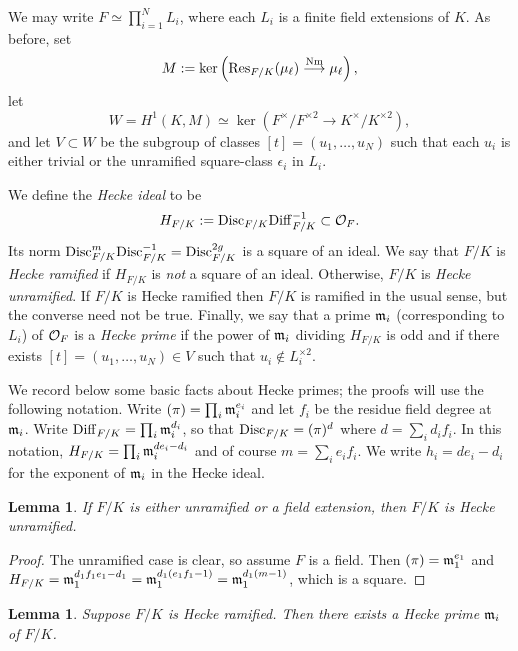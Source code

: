 \documentclass[11pt,a4paper]{amsart}
\def\m{{\rm \mathfrak{m}}}
\def\O{{\rm \mathcal{O}}}
\def\Nm{{\rm Nm}}
\def\Diff{{\rm Diff}}
\def\Disc{{\rm Disc}}
\def\Res{{\rm Res}}
\numberwithin{equation}{section}
\newtheorem{lemma}[theorem]{Lemma}
\begin{document}
We may write $F \simeq \prod_{i = 1}^N L_i$, where each $L_i$ is a finite field extensions of $K$. As before, set
\[M := \ker\left(\Res_{F/K}(\mu_\ell) \stackrel{\Nm}{\longrightarrow} \mu_\ell\right),\]
let 
\[W = H^1(K, M) \simeq \ker(F^\times/F^{\times 2} \to K^\times/K^{\times 2}),\] 
and let $V \subset W$ be the subgroup of classes $[t] = (u_1,\ldots, u_N)$ such that each $u_i$ is either trivial or the unramified square-class $\epsilon_i$ in $L_i$. 


We define the {\it Hecke ideal} to be
\[H_{F/K} := \Disc_{F/K}\mathrm{Diff}_{F/K}^{-1} \subset \O_F.\]
Its norm $\Disc_{F/K}^m\Disc_{F/K}^{-1} = \Disc_{F/K}^{2g}$ is a square of an ideal. We say that $F/K$ is {\it Hecke ramified} if $H_{F/K}$ is {\it not} a square of an ideal. Otherwise, $F/K$ is {\it Hecke unramified}.  If $F/K$ is Hecke ramified then $F/K$ is ramified in the usual sense, but the converse need not be true. Finally, we say that a prime $\m_i$ (corresponding to $L_i$) of $\O_F$ is a {\it Hecke prime} if the power of $\m_i$ dividing $H_{F/K}$ is odd and if there exists $[t] = (u_1,\ldots,u_N) \in V$ such that $u_i \notin L_i^{\times2}$. 

We record below some basic facts about Hecke primes; the proofs will use the following notation. Write $(\pi) = \prod_i \m_i^{e_i}$ and let $f_i$ be the residue field degree at $\m_i$.  Write $\Diff_{F/K} = \prod_i \m_i^{d_i}$, so that $\Disc_{F/K} = (\pi)^d$ where $d = \sum_i d_if_i$. In this notation, $H_{F/K} = \prod_i \m_i^{de_i - d_i}$ and of course $m = \sum_i e_i f_i$. We write $h_i = de_i - d_i$ for the exponent of $\m_i$ in the Hecke ideal.


\begin{lemma}\label{lem: unram or tot ram}
    If $F/K$ is either unramified or a field extension, then $F/K$ is Hecke unramified.
\end{lemma}

\begin{proof}
    The unramified case is clear, so assume $F$ is a field. Then $(\pi) = \m_1^{e_1}$ and $H_{F/K} = \m_1^{d_1f_1e_1 - d_1} = \m_1^{d_1(e_1f_1 - 1)} = \m_1^{d_1(m-1)}$, which is a square.
\end{proof}

\begin{lemma}\label{lem: hecke ramified implies hecke prime}
Suppose $F/K$ is Hecke ramified. Then there exists a Hecke prime $\m_i$ of $F/K$.     
\end{lemma}
\end{document}
